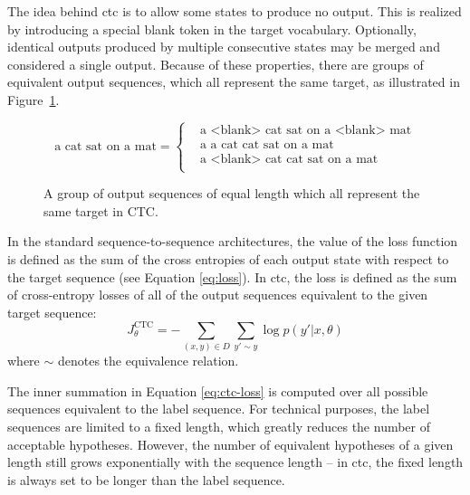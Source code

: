 The idea behind \ac{ctc} is to allow some states to produce no output. This is
realized by introducing a special blank token in the target vocabulary.
Optionally, identical outputs produced by multiple consecutive states may be
merged and considered a single output. Because of these properties, there are
groups of equivalent output sequences, which all represent the same target, as
illustrated in Figure~\ref{fig:ctc-equivalent-sequences}.

\begin{figure}
  \centering
  \begin{minipage}{\textwidth}
    \begin{equation*}
        \text{a cat sat on a mat} =
        \begin{cases}
          & \text{a <blank> cat sat on a <blank> mat} \\
          & \text{a a cat cat sat on a mat} \\
          & \text{a <blank> cat cat sat on a mat} \\
        \end{cases}
    \end{equation*}
  \end{minipage}
  \caption{A group of output sequences of equal length which all represent the
    same target in CTC.} %
  \label{fig:ctc-equivalent-sequences}
\end{figure}

In the standard sequence-to-sequence architectures, the value of the loss
function is defined as the sum of the cross entropies of each output state with
respect to the target sequence (see Equation \ref{eq:loss}). In \ac{ctc}, the
loss is defined as the sum of cross-entropy losses of all of the output
sequences equivalent to the given target sequence:
%
\begin{equation}
  J_{\theta}^{\text{CTC}} = - \sum_{(x, y) \in D} \sum_{y' \sim y}  \log p(y' | x, \theta)
  \label{eq:ctc-loss}
\end{equation}
%
where $\sim$ denotes the equivalence relation.  

The inner summation in Equation \ref{eq:ctc-loss} is computed over all possible
sequences equivalent to the label sequence. For technical purposes, the label
sequences are limited to a fixed length, which greatly reduces the number of
acceptable hypotheses. However, the number of equivalent hypotheses of a given
length still grows exponentially with the sequence length -- in \ac{ctc}, the
fixed length is always set to be longer than the label sequence. 

